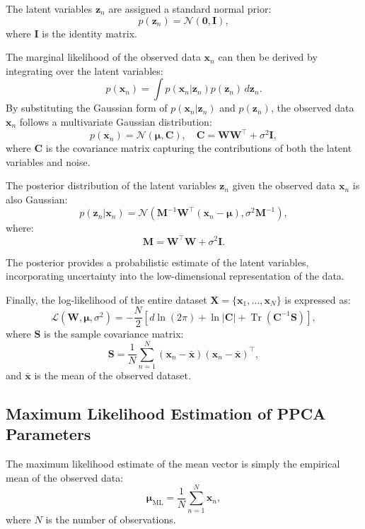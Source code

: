 \documentclass{article}
\begin{document}
The latent variables \( \mathbf{z}_n \) are assigned a standard normal prior:
\[
p(\mathbf{z}_n) = \mathcal{N}(\mathbf{0}, \mathbf{I}),
\]
where \( \mathbf{I} \) is the identity matrix. 

The marginal likelihood of the observed data \( \mathbf{x}_n \) can then be derived by integrating over the latent variables:
\[
p(\mathbf{x}_n) = \int p(\mathbf{x}_n | \mathbf{z}_n) p(\mathbf{z}_n) \, d\mathbf{z}_n.
\]
By substituting the Gaussian form of \( p(\mathbf{x}_n | \mathbf{z}_n) \) and \( p(\mathbf{z}_n) \), the observed data \( \mathbf{x}_n \) follows a multivariate Gaussian distribution:
\[
p(\mathbf{x}_n) = \mathcal{N}(\boldsymbol{\mu}, \mathbf{C}), \quad \mathbf{C} = \mathbf{W} \mathbf{W}^\top + \sigma^2 \mathbf{I},
\]
where \( \mathbf{C} \) is the covariance matrix capturing the contributions of both the latent variables and noise.



The posterior distribution of the latent variables \( \mathbf{z}_n \) given the observed data \( \mathbf{x}_n \) is also Gaussian:
\[
p(\mathbf{z}_n | \mathbf{x}_n) = \mathcal{N}(\mathbf{M}^{-1} \mathbf{W}^\top (\mathbf{x}_n - \boldsymbol{\mu}), \sigma^2 \mathbf{M}^{-1}),
\]
where:
\[
\mathbf{M} = \mathbf{W}^\top \mathbf{W} + \sigma^2 \mathbf{I}.
\]

The posterior provides a probabilistic estimate of the latent variables, incorporating uncertainty into the low-dimensional representation of the data.

Finally, the log-likelihood of the entire dataset \( \mathbf{X} = \{\mathbf{x}_1, \dots, \mathbf{x}_N\} \) is expressed as:
\[
\mathcal{L}(\mathbf{W}, \boldsymbol{\mu}, \sigma^2) = -\frac{N}{2} \left[ d \ln(2\pi) + \ln |\mathbf{C}| + \operatorname{Tr}(\mathbf{C}^{-1} \mathbf{S}) \right],
\]
where \( \mathbf{S} \) is the sample covariance matrix:
\[
\mathbf{S} = \frac{1}{N} \sum_{n=1}^N (\mathbf{x}_n - \bar{\mathbf{x}})(\mathbf{x}_n - \bar{\mathbf{x}})^\top,
\]
and \( \bar{\mathbf{x}} \) is the mean of the observed dataset.

\subsection{Maximum Likelihood Estimation of PPCA Parameters}

The maximum likelihood estimate of the mean vector is simply the empirical mean of the observed data:
\[
\boldsymbol{\mu}_{\text{ML}} = \frac{1}{N} \sum_{n=1}^N \mathbf{x}_n,
\]
where \(N\) is the number of observations.
\end{document}
